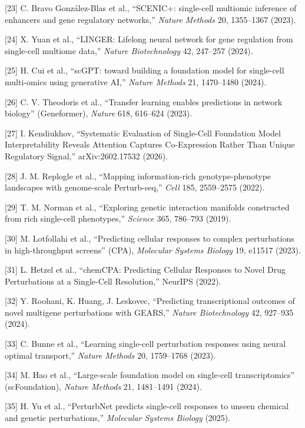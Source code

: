 \documentclass[
]{article}
\begin{document}
{[}23{]} C. Bravo González-Blas et al., ``SCENIC+: single-cell multiomic
inference of enhancers and gene regulatory networks,'' \emph{Nature
Methods} 20, 1355--1367 (2023).

{[}24{]} X. Yuan et al., ``LINGER: Lifelong neural network for gene
regulation from single-cell multiome data,'' \emph{Nature Biotechnology}
42, 247--257 (2024).

{[}25{]} H. Cui et al., ``scGPT: toward building a foundation model for
single-cell multi-omics using generative AI,'' \emph{Nature Methods} 21,
1470--1480 (2024).

{[}26{]} C. V. Theodoris et al., ``Transfer learning enables predictions
in network biology'' (Geneformer), \emph{Nature} 618, 616--624 (2023).

{[}27{]} I. Kendiukhov, ``Systematic Evaluation of Single-Cell
Foundation Model Interpretability Reveals Attention Captures
Co-Expression Rather Than Unique Regulatory Signal,'' arXiv:2602.17532
(2026).

{[}28{]} J. M. Replogle et al., ``Mapping information-rich
genotype-phenotype landscapes with genome-scale Perturb-seq,''
\emph{Cell} 185, 2559--2575 (2022).

{[}29{]} T. M. Norman et al., ``Exploring genetic interaction manifolds
constructed from rich single-cell phenotypes,'' \emph{Science} 365,
786--793 (2019).

{[}30{]} M. Lotfollahi et al., ``Predicting cellular responses to
complex perturbations in high-throughput screens'' (CPA),
\emph{Molecular Systems Biology} 19, e11517 (2023).

{[}31{]} L. Hetzel et al., ``chemCPA: Predicting Cellular Responses to
Novel Drug Perturbations at a Single-Cell Resolution,'' NeurIPS (2022).

{[}32{]} Y. Roohani, K. Huang, J. Leskovec, ``Predicting transcriptional
outcomes of novel multigene perturbations with GEARS,'' \emph{Nature
Biotechnology} 42, 927--935 (2024).

{[}33{]} C. Bunne et al., ``Learning single-cell perturbation responses
using neural optimal transport,'' \emph{Nature Methods} 20, 1759--1768
(2023).

{[}34{]} M. Hao et al., ``Large-scale foundation model on single-cell
transcriptomics'' (scFoundation), \emph{Nature Methods} 21, 1481--1491
(2024).

{[}35{]} H. Yu et al., ``PerturbNet predicts single-cell responses to
unseen chemical and genetic perturbations,'' \emph{Molecular Systems
Biology} (2025).
\end{document}
